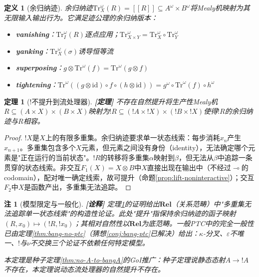 \documentclass[11pt,a4paper]{article}
\newtheorem{definition}{定义}
\newtheorem{theorem}{定理}
\newtheorem{remark}{注}
\newcommand{\lvl}[1]{\hfill\textbf{\footnotesize[#1]}}
\newcommand{\lvP}{\lvl{定理}}
\newcommand{\lvI}{\lvl{诠释}}
\newcommand{\lolli}{\multimap}
\newcommand{\bang}{{!}}
\newcommand{\tensor}{\otimes}
\begin{document}
\begin{definition}[余归纳迹]\label{def:coinductive-trace}
余归纳迹$\mathrm{Tr}^\omega_X(R)=[\![ R]\!]\subseteq A^\omega\times B^\omega$将Mealy机映射为其无限输入输出行为。它满足迹公理的余归纳版本：
\begin{itemize}
  \item \textbf{vanishing}：$\mathrm{Tr}^\omega_I(R)$逐点应用；$\mathrm{Tr}^\omega_{X\times Y}=\mathrm{Tr}^\omega_X\circ\mathrm{Tr}^\omega_Y$
  \item \textbf{yanking}：$\mathrm{Tr}^\omega_X(\sigma)$诱导恒等流
  \item \textbf{superposing}：$g\otimes\mathrm{Tr}^\omega(f)=\mathrm{Tr}^\omega(g\otimes f)$
  \item \textbf{tightening}：$\mathrm{Tr}^\omega((g\otimes\mathrm{id})\circ f\circ(h\otimes\mathrm{id}))=g^\omega\circ\mathrm{Tr}^\omega(f)\circ h^\omega$
\end{itemize}
\end{definition}

\begin{theorem}[!不提升到流处理器]\label{thm:no-bang-stream}\lvP
不存在自然提升将生产性Mealy机$R\subseteq(A\times X)\times(B\times X)$映射为$\bang R\subseteq(\bang A\times\bang X)\times(\bang B\times\bang X)$使得$\bang R$的余归纳迹与$R$相容。
\end{theorem}

\begin{proof}
$\bang X$是$X$上的有限多重集。余归纳迹要求单一状态线索：每步消耗$x_n$产生$x_{n+1}$。多重集包含多个$X$元素，但元素之间没有身份（identity），无法确定哪个元素是"正在运行的当前状态"。$\bang R$的转移将多重集$\alpha$映射到$\beta$，但无法从$\beta$中追踪一条贯穿的状态线索。非交互$F_1(X)=X\tensor B$中$X$直接出现在输出中（不经过$\lolli$的codomain），配对唯一确定线索，故可提升（命题\ref{prop:lift-noninteractive}）；交互$F_2$中$X$是函数产出，多重集无法追踪。
\end{proof}

\begin{remark}[模型限定与一般化]\lvI
定理\ref{thm:no-bang-stream}的证明给出$\mathbf{Rel}$（关系范畴）中"多重集无法追踪单一状态线索"的构造性论证。此处"提升"指保持余归纳迹的函子映射$(R,x_0)\mapsto(\bang R,\bang x_0)$；其相对自然性以$\mathbf{Rel}$为底范畴。一般PTC中的完全一般性已由定理\ref{thm:bang-no-ptc}（猜想\ref{conj:bang-ptc}已解决）给出：$\kappa$-分叉、$\varepsilon$不唯一、$\bang$与$\nu$不交换三个论证不依赖任何特定模型。

本定理是种子定理\ref{thm:no-A-to-bangA}的GoI推广：种子定理说静态态射$A\to\bang A$不存在，本定理说动态流处理器的自然提升不存在。
\end{remark}
\end{document}
